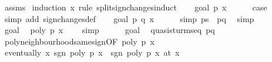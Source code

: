 \begin{isabellebody}
%
\isadelimproof
%
\endisadelimproof
%
\isatagproof
{}\isamarkupfalse%
\ assms\isanewline
{}\isamarkupfalse%
\ {\isacharparenleft}induction\ x\ rule{\isacharcolon}\ split{\isacharunderscore}sign{\isacharunderscore}changes{\isacharunderscore}induct{\isacharparenright}\isanewline
\ \ \isamarkupfalse%
\ {\isacharparenleft}goal{}\ p\ x{\isacharparenright}\isanewline
\ \ \ \ \isamarkupfalse%
\ {\isacharquery}case\ \isamarkupfalse%
\ {\isacharparenleft}simp\ add{\isacharcolon}\ sign{\isacharunderscore}changes{\isacharunderscore}def{\isacharparenright}\isanewline
{}\isamarkupfalse%
\isanewline
\ \ \isamarkupfalse%
\ {\isacharparenleft}goal{}\ p\ q\ x\isanewline
\ \ \ \ \isamarkupfalse%
\ {\isacharbrackleft}simp{\isacharbrackright}{\isacharcolon}\ {\isachardoublequoteopen}ps{\isacharprime}\ {\isacharequal}\ {\isacharbrackleft}p{\isacharcomma}q{\isacharbrackright}{\isachardoublequoteclose}\ \isamarkupfalse%
\ simp\isanewline
\ \ \ \ \isamarkupfalse%
\ goal{}\ \isamarkupfalse%
\ {\isachardoublequoteopen}poly\ p\ x\ {\isasymnoteq}\ {}{\isachardoublequoteclose}\ \isamarkupfalse%
\ simp\isanewline
\ \ \ \ \isamarkupfalse%
\ goal{}{\isacharparenleft}{}{\isacharparenright}\ \isamarkupfalse%
\ quasi{\isacharunderscore}sturm{\isacharunderscore}seq\ {\isachardoublequoteopen}{\isacharbrackleft}p{\isacharcomma}q{\isacharbrackright}{\isachardoublequoteclose}\ \isacommand{{\isachardot}}\isamarkupfalse%
\isanewline
\ \ \ \ \isamarkupfalse%
\ poly{\isacharunderscore}neighbourhood{\isacharunderscore}same{\isacharunderscore}sign{\isacharbrackleft}OF\ {\isacharbackquoteopen}poly\ p\ x\ {\isasymnoteq}\ {}{\isacharbackquoteclose}{\isacharbrackright}\isanewline
\ \ \ \ \ \ \ \ \isamarkupfalse%
\ {\isachardoublequoteopen}eventually\ {\isacharparenleft}{\isasymlambda}x{\isachardot}\ sgn\ {\isacharparenleft}poly\ p\ x{\isacharparenright}\ {\isacharequal}\ sgn\ {\isacharparenleft}poly\ p\ x\ {\isacharparenleft}at\ x\ \isacommand{{\isachardot}}\isamarkupfalse%
\isanewline
\ \ \ \ \isamarkupfalse%

\end{isabellebody}

